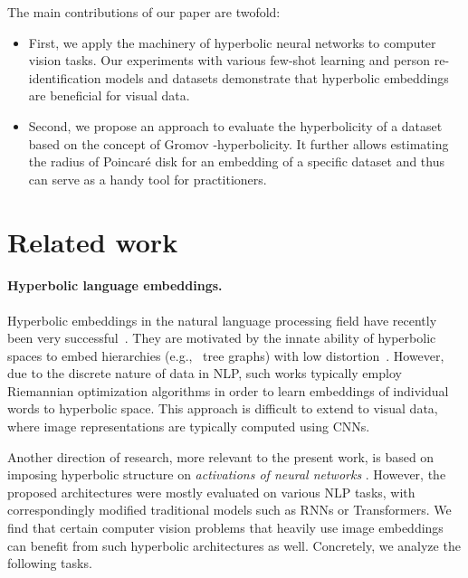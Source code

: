 \documentclass[10pt,twocolumn,letterpaper]{article}
\begin{document}
The main contributions of our paper are twofold:
\begin{itemize}
\item First, we apply the machinery of hyperbolic neural networks to computer vision tasks. Our experiments with various few-shot learning and person re-identification models and datasets demonstrate that hyperbolic embeddings are beneficial for visual data. 
\item Second, we propose an approach to evaluate the hyperbolicity of a dataset based on the concept of Gromov -hyperbolicity. It further allows estimating the radius of Poincar\'e disk for an embedding of a specific dataset and thus can serve as a handy tool for practitioners.
\end{itemize}




 \section{Related work}
\paragraph{Hyperbolic language embeddings.} Hyperbolic embeddings in the natural language processing field have recently been very successful~\cite{nickel2017poincare, Nickel18}. They are motivated by the innate ability of hyperbolic spaces to embed hierarchies (e.g., \ tree graphs) with low distortion~\cite{sala2018representation,sarkar2011low}. However, due to the discrete nature of data in NLP, such works typically employ Riemannian optimization algorithms in order to learn embeddings of individual words to hyperbolic space. This approach is difficult to extend to visual data, where image representations are typically computed using CNNs.

Another direction of research, more relevant to the present work, is based on imposing hyperbolic structure on \emph{activations of neural networks} \cite{ganea2018hyperbolic,gulcehre2018hyperbolic}. However, the proposed architectures were mostly evaluated on various NLP tasks, with correspondingly modified traditional models such as RNNs or Transformers. We find that certain computer vision problems that heavily use image embeddings can benefit from such hyperbolic architectures as well. Concretely, we analyze the following tasks.
\vspace{-5mm}
\end{document}
